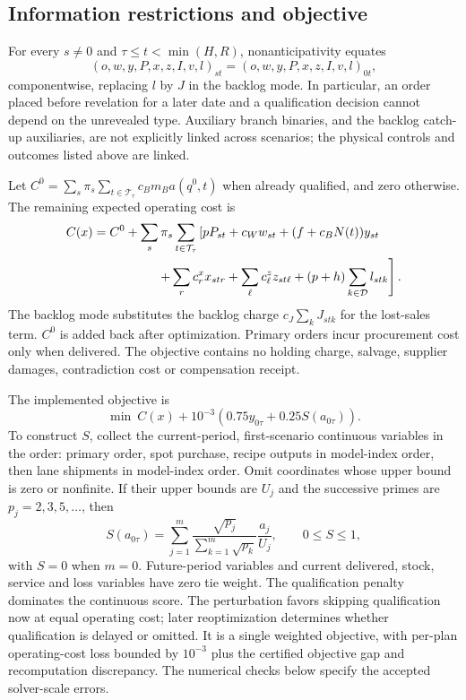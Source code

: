 \documentclass[preprint,11pt,authoryear]{elsarticle}
\begin{document}
\subsection{Information restrictions and objective}
For every $s\ne0$ and $\tau\le t<\min(H,R)$, nonanticipativity equates
\begin{equation}
 (o,w,y,P,x,z,I,v,l)_{st}=(o,w,y,P,x,z,I,v,l)_{0t},\label{eq:net_nonanticipativity}
\end{equation}
componentwise, replacing $l$ by $J$ in the backlog mode. In particular, an order placed before revelation for a later date and a qualification decision cannot depend on the unrevealed type. Auxiliary branch binaries, and the backlog catch-up auxiliaries, are not explicitly linked across scenarios; the physical controls and outcomes listed above are linked.

Let $C^0=\sum_s\pi_s\sum_{t\in\mathcal T_\tau}c_Bm_Ba(q^0,t)$ when already qualified, and zero otherwise. The remaining expected operating cost is
\begin{align}
 C(x)&=C^0+\sum_s\pi_s\sum_{t\in\mathcal T_\tau}\left[
 pP_{st}+c_Ww_{st}+(f+c_BN(t))y_{st}
\right.\nonumber\\
 &\hspace{18mm}\left.+\sum_r c^x_rx_{str}+\sum_\ell c^z_\ell z_{st\ell}
 +(p+h)\sum_{k\in\mathcal D}l_{stk}\right].\label{eq:net_cost}
\end{align}
The backlog mode substitutes the backlog charge $c_J\sum_kJ_{stk}$ for the lost-sales term. $C^0$ is added back after optimization. Primary orders incur procurement cost only when delivered. The objective contains no holding charge, salvage, supplier damages, contradiction cost or compensation receipt.

The implemented objective is
\begin{equation}
 \min\ C(x)+10^{-3}\left(0.75y_{0\tau}+0.25S(a_{0\tau})\right).\label{eq:planner}
\end{equation}
To construct $S$, collect the current-period, first-scenario continuous variables in the order: primary order, spot purchase, recipe outputs in model-index order, then lane shipments in model-index order. Omit coordinates whose upper bound is zero or nonfinite. If their upper bounds are $U_j$ and the successive primes are $p_j=2,3,5,\ldots$, then
\begin{equation}
 S(a_{0\tau})=\sum_{j=1}^{m}\frac{\sqrt{p_j}}{\sum_{k=1}^{m}\sqrt{p_k}}\frac{a_j}{U_j},\qquad 0\le S\le1,\label{eq:net_score}
\end{equation}
with $S=0$ when $m=0$. Future-period variables and current delivered, stock, service and loss variables have zero tie weight. The qualification penalty dominates the continuous score. The perturbation favors skipping qualification now at equal operating cost; later reoptimization determines whether qualification is delayed or omitted. It is a single weighted objective, with per-plan operating-cost loss bounded by $10^{-3}$ plus the certified objective gap and recomputation discrepancy. The numerical checks below specify the accepted solver-scale errors.
\end{document}
